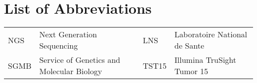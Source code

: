 \section*{List of Abbreviations}

\begin{table}[htbp]
\begin{tabular}{p{1cm} p{6.5cm} | p{1cm} p{6.5cm}}
    NGS     &  Next Generation Sequencing   & LNS     &  Laboratoire National de Sante  \\
    SGMB     &  Service of Genetics and Molecular Biology          & TST15     &  Illumina TruSight Tumor 15
\end{tabular}
\end{table}
